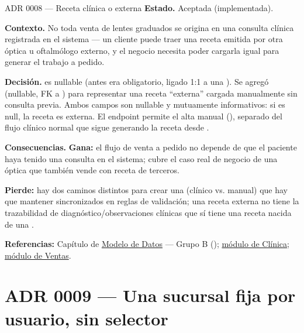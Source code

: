 \begin{cajaADR}{ADR 0008 --- Receta clínica o externa}
\textbf{Estado.} Aceptada (implementada).

\textbf{Contexto.} No toda venta de lentes graduados se origina en una consulta clínica registrada en el sistema --- un cliente puede traer una receta emitida por otra óptica u oftalmólogo externo, y el negocio necesita poder cargarla igual para generar el trabajo a pedido.

\textbf{Decisión.} \allowbreak {} es nullable (antes era obligatorio, ligado 1:1 a una ). Se agregó  (nullable, FK a ) para representar una receta ``externa'' cargada manualmente sin consulta previa. Ambos campos son nullable y mutuamente informativos: si  es null, la receta es externa. El endpoint  permite el alta manual (\allowbreak {}\allowbreak {}\allowbreak {}), separado del flujo clínico normal que sigue generando la receta desde \allowbreak {}\allowbreak {}.

\textbf{Consecuencias.} \textbf{Gana:} el flujo de venta a pedido no depende de que el paciente haya tenido una consulta en el sistema; cubre el caso real de negocio de una óptica que también vende con receta de terceros.

\textbf{Pierde:} hay dos caminos distintos para crear una  (clínico vs. manual) que hay que mantener sincronizados en reglas de validación; una receta externa no tiene la trazabilidad de diagnóstico/observaciones clínicas que sí tiene una receta nacida de una .
\end{cajaADR}

\textbf{Referencias:} Capítulo de \hyperref[sec:modelo-datos]{Modelo de Datos} --- Grupo B (); \hyperref[mod:05-clinica]{módulo de Clínica}; \hyperref[mod:08-ventas]{módulo de Ventas}.

\section{ADR 0009 --- Una sucursal fija por usuario, sin selector}
\label{adr:0009}

